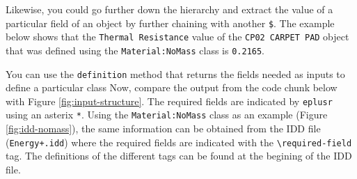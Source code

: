 \documentclass[
]{book}
\newenvironment{Shaded}{\begin{snugshade}}{\end{snugshade}}
\newcommand{\AttributeTok}[1]{\textcolor[rgb]{0.77,0.63,0.00}{#1}}
\newcommand{\DocumentationTok}[1]{\textcolor[rgb]{0.56,0.35,0.01}{\textbf{\textit{#1}}}}
\newcommand{\NormalTok}[1]{#1}
\newcommand{\SpecialCharTok}[1]{\textcolor[rgb]{0.00,0.00,0.00}{#1}}
\newcommand{\StringTok}[1]{\textcolor[rgb]{0.31,0.60,0.02}{#1}}
\begin{document}
\begin{Shaded}
\end{Shaded}

Likewise, you could go further down the hierarchy and extract the value of a particular field of an object by further chaining with another \texttt{\$}. The example below shows that the \texttt{Thermal\ Resistance} value of the \texttt{CP02\ CARPET\ PAD} object that was defined using the \texttt{Material:NoMass} class is \texttt{0.2165}.

\begin{Shaded}
\end{Shaded}

You can use the \texttt{definition} method that returns the fields needed as inputs to define a particular class
Now, compare the output from the code chunk below with Figure \ref{fig:input-structure}. The required fields are indicated by \texttt{eplusr} using an asterix \texttt{*}. Using the \texttt{Material:NoMass} class as an example (Figure \ref{fig:idd-nomass}), the same information can be obtained from the IDD file (\texttt{Energy+.idd}) where the required fields are indicated with the \texttt{\textbackslash{}required-field} tag. The definitions of the different tags can be found at the begining of the IDD file.
\end{document}
